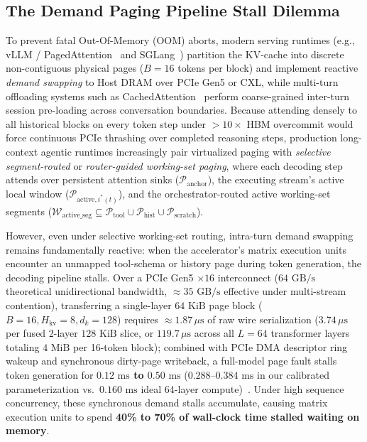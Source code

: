 \documentclass[conference,10pt]{IEEEtran}
\begin{document}
\subsection{The Demand Paging Pipeline Stall Dilemma}
To prevent fatal Out-Of-Memory (OOM) aborts, modern serving runtimes (e.g., vLLM / PagedAttention~\cite{kwon2023efficient} and SGLang~\cite{zheng2024sglang}) partition the KV-cache into discrete non-contiguous physical pages ($B = 16$ tokens per block) and implement reactive \textit{demand swapping} to Host DRAM over PCIe Gen5 or CXL, while multi-turn offloading systems such as CachedAttention~\cite{gao2024cachedattention} perform coarse-grained inter-turn session pre-loading across conversation boundaries. Because attending densely to all historical blocks on every token step under $>10\times$ HBM overcommit would force continuous PCIe thrashing over completed reasoning steps, production long-context agentic runtimes increasingly pair virtualized paging with \textit{selective segment-routed} or \textit{router-guided working-set paging}, where each decoding step attends over persistent attention sinks ($\mathcal{P}_{\text{anchor}}$), the executing stream's active local window ($\mathcal{P}_{\text{active}, i^*(t)}$), and the orchestrator-routed active working-set segments ($\mathcal{W}_{\text{active\_seg}} \subseteq \mathcal{P}_{\text{tool}} \cup \mathcal{P}_{\text{hist}} \cup \mathcal{P}_{\text{scratch}}$).

However, even under selective working-set routing, intra-turn demand swapping remains fundamentally reactive: when the accelerator's matrix execution units encounter an unmapped tool-schema or history page during token generation, the decoding pipeline stalls. Over a PCIe Gen5 $\times 16$ interconnect ($64\text{ GB/s}$ theoretical unidirectional bandwidth, $\approx 35\text{ GB/s}$ effective under multi-stream contention), transferring a single-layer $64\text{ KiB}$ page block ($B=16, H_{\text{kv}}=8, d_k=128$) requires $\approx 1.87\,\mu\text{s}$ of raw wire serialization ($3.74\,\mu\text{s}$ per fused 2-layer $128\text{ KiB}$ slice, or $119.7\,\mu\text{s}$ across all $L = 64$ transformer layers totaling $4\text{ MiB}$ per 16-token block); combined with PCIe DMA descriptor ring wakeup and synchronous dirty-page writeback, a full-model page fault stalls token generation for \textbf{$0.12\text{ ms}$ to $0.50\text{ ms}$} ($0.288\text{--}0.384\text{ ms}$ in our calibrated parameterization vs.\ $0.160\text{ ms}$ ideal 64-layer compute)~\cite{sheng2023flexgen, lee2024infinigen}. Under high sequence concurrency, these synchronous demand stalls accumulate, causing matrix execution units to spend \textbf{40\% to 70\% of wall-clock time stalled waiting on memory}.
\end{document}
